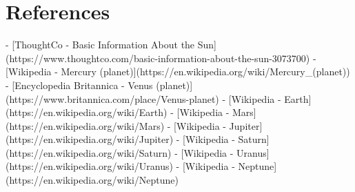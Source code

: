 \documentclass{article}
\begin{document}
\section{References}
- [ThoughtCo - Basic Information About the Sun](https://www.thoughtco.com/basic-information-about-the-sun-3073700)
- [Wikipedia - Mercury (planet)](https://en.wikipedia.org/wiki/Mercury_(planet))
- [Encyclopedia Britannica - Venus (planet)](https://www.britannica.com/place/Venus-planet)
- [Wikipedia - Earth](https://en.wikipedia.org/wiki/Earth)
- [Wikipedia - Mars](https://en.wikipedia.org/wiki/Mars)
- [Wikipedia - Jupiter](https://en.wikipedia.org/wiki/Jupiter)
- [Wikipedia - Saturn](https://en.wikipedia.org/wiki/Saturn)
- [Wikipedia - Uranus](https://en.wikipedia.org/wiki/Uranus)
- [Wikipedia - Neptune](https://en.wikipedia.org/wiki/Neptune)
\end{document}
